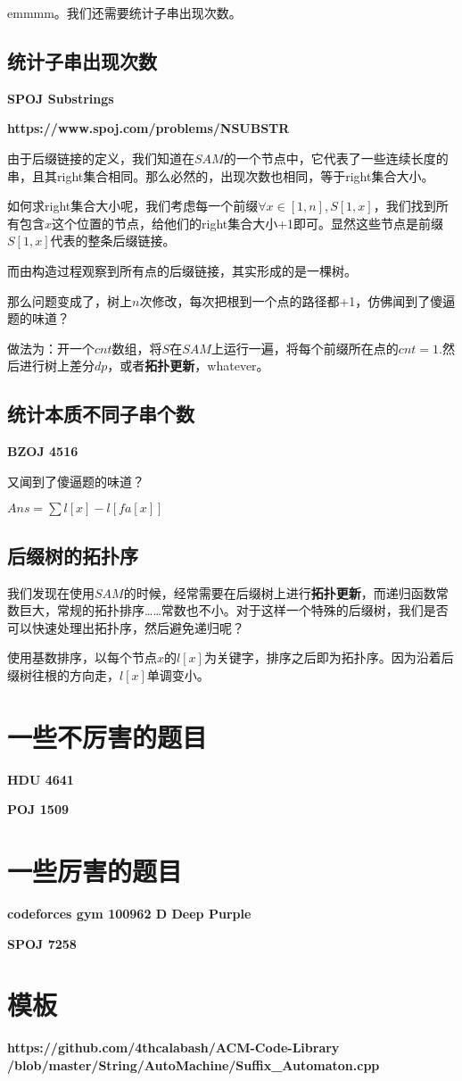 \documentclass[UTF8]{article}
\begin{document}
emmmm。我们还需要统计子串出现次数。
\subsection{统计子串出现次数}
\textbf{SPOJ Substrings}

\textbf{https://www.spoj.com/problems/NSUBSTR}

由于后缀链接的定义，我们知道在$SAM$的一个节点中，它代表了一些连续长度的串，且其right集合相同。那么必然的，出现次数也相同，等于right集合大小。

如何求right集合大小呢，我们考虑每一个前缀$\forall x\in[1,n],S[1,x]$，我们找到所有包含$x$这个位置的节点，给他们的right集合大小+1即可。显然这些节点是前缀$S[1,x]$代表的整条后缀链接。

而由构造过程观察到所有点的后缀链接，其实形成的是一棵树。

那么问题变成了，树上$n$次修改，每次把根到一个点的路径都+1，仿佛闻到了傻逼题的味道？

做法为：开一个$cnt$数组，将$S$在$SAM$上运行一遍，将每个前缀所在点的$cnt = 1$.然后进行$\mbox{树上差分}dp$，或者\textbf{拓扑更新}，whatever。
\subsection{统计本质不同子串个数}
\textbf{BZOJ 4516}

又闻到了傻逼题的味道？

$Ans = \sum{l[x] - l[fa[x]]}$
\subsection{后缀树的拓扑序}
我们发现在使用$SAM$的时候，经常需要在后缀树上进行\textbf{拓扑更新}，而递归函数常数巨大，常规的拓扑排序……常数也不小。对于这样一个特殊的后缀树，我们是否可以快速处理出拓扑序，然后避免递归呢？

使用基数排序，以每个节点$x$的$l[x]$为关键字，排序之后即为拓扑序。因为沿着后缀树往根的方向走，$l[x]$单调变小。

\vspace{\baselineskip}
\noindent\hrulefill

\section{一些不厉害的题目}
\textbf{HDU 4641}

\textbf{POJ 1509}
\section{一些厉害的题目}
\textbf{codeforces gym 100962 D Deep Purple}

\textbf{SPOJ 7258}
\section{模板}
\textbf{https://github.com/4thcalabash/ACM-Code-Library} \\ \textbf{/blob/master/String/AutoMachine/Suffix\_Automaton.cpp}
\end{document}
